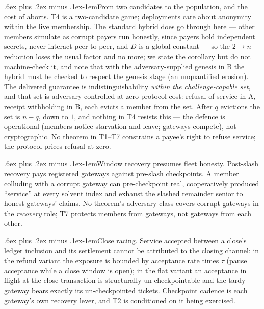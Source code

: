 \documentclass[9pt]{extarticle}
\makeatletter
\renewcommand\paragraph{\@startsection{paragraph}{4}{0pt}%
  {.6ex plus .2ex minus .1ex}{-1em}{\normalfont\normalsize\bfseries}}
\makeatother
\begin{document}
\paragraph{From two candidates to the population, and the cost of aborts.}
T4 is a two-candidate game; deployments care about anonymity within the live
membership. The standard hybrid does go through here --- other members
simulate as corrupt payers run honestly, since payers hold independent
secrets, never interact peer-to-peer, and $D$ is a global constant --- so
the $2 \to n$ reduction loses the usual factor and no more; we state the
corollary but do not machine-check it, and note that with the
adversary-supplied genesis in B the hybrid must be checked to respect the
genesis stage (an unquantified erosion). The delivered guarantee is
indistinguishability \emph{within the challenge-capable set}, and that set
is adversary-controlled at zero protocol cost: refusal of service in A,
receipt withholding in B, each evicts a member from the set. After $q$
evictions the set is $n - q$, down to $1$, and nothing in T4 resists this
--- the defence is operational (members notice starvation and leave;
gateways compete), not cryptographic. No theorem in T1--T7 constrains a
payee's right to refuse service; the protocol prices refusal at zero.

\paragraph{Window recovery presumes fleet honesty.} Post-slash recovery
pays registered gateways against pre-slash checkpoints. A member colluding
with a corrupt gateway can pre-checkpoint real, cooperatively produced
``service'' at every solvent index and exhaust the slashed remainder
senior to honest gateways' claims. No theorem's adversary class covers
corrupt gateways in the \emph{recovery} role; T7 protects members from
gateways, not gateways from each other.

\paragraph{Close racing.} Service accepted between a close's ledger
inclusion and its settlement cannot be attributed to the closing channel:
in the refund variant the exposure is bounded by acceptance rate times
$\tau$ (pause acceptance while a close window is open); in the flat
variant an acceptance in flight at the close transaction is structurally
un-checkpointable and the tardy gateway bears exactly its un-checkpointed
tickets. Checkpoint cadence is each gateway's own recovery lever, and T2
is conditioned on it being exercised.
\end{document}
